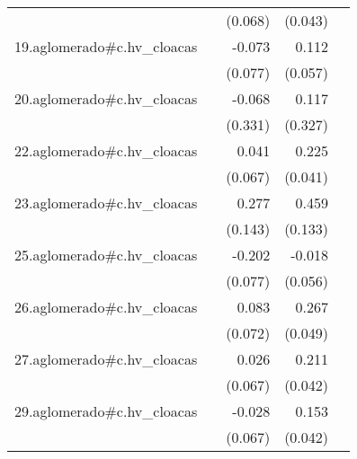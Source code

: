 {\begin{longtable}{l*{4}{D{.}{.}{-1}}}
            &                     &     (0.068)         &     (0.043)         &                     \\
\addlinespace
19.aglomerado#c.hv\_cloacas&                     &      -0.073         &       0.112\sym{*}  &                     \\
            &                     &     (0.077)         &     (0.057)         &                     \\
\addlinespace
20.aglomerado#c.hv\_cloacas&                     &      -0.068         &       0.117         &                     \\
            &                     &     (0.331)         &     (0.327)         &                     \\
\addlinespace
22.aglomerado#c.hv\_cloacas&                     &       0.041         &       0.225\sym{***}&                     \\
            &                     &     (0.067)         &     (0.041)         &                     \\
\addlinespace
23.aglomerado#c.hv\_cloacas&                     &       0.277         &       0.459\sym{***}&                     \\
            &                     &     (0.143)         &     (0.133)         &                     \\
\addlinespace
25.aglomerado#c.hv\_cloacas&                     &      -0.202\sym{**} &      -0.018         &                     \\
            &                     &     (0.077)         &     (0.056)         &                     \\
\addlinespace
26.aglomerado#c.hv\_cloacas&                     &       0.083         &       0.267\sym{***}&                     \\
            &                     &     (0.072)         &     (0.049)         &                     \\
\addlinespace
27.aglomerado#c.hv\_cloacas&                     &       0.026         &       0.211\sym{***}&                     \\
            &                     &     (0.067)         &     (0.042)         &                     \\
\addlinespace
29.aglomerado#c.hv\_cloacas&                     &      -0.028         &       0.153\sym{***}&                     \\
            &                     &     (0.067)         &     (0.042)         &                     \\

\end{longtable}}
